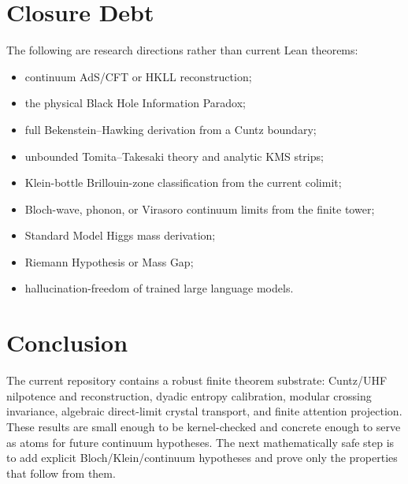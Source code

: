 \documentclass[11pt,a4paper]{article}
\begin{document}
\section{Closure Debt}

The following are research directions rather than current Lean theorems:
\begin{itemize}
  \item continuum AdS/CFT or HKLL reconstruction;
  \item the physical Black Hole Information Paradox;
  \item full Bekenstein--Hawking derivation from a Cuntz boundary;
  \item unbounded Tomita--Takesaki theory and analytic KMS strips;
  \item Klein-bottle Brillouin-zone classification from the current colimit;
  \item Bloch-wave, phonon, or Virasoro continuum limits from the finite tower;
  \item Standard Model Higgs mass derivation;
  \item Riemann Hypothesis or Mass Gap;
  \item hallucination-freedom of trained large language models.
\end{itemize}

\section{Conclusion}

The current repository contains a robust finite theorem substrate: Cuntz/UHF
nilpotence and reconstruction, dyadic entropy calibration, modular crossing
invariance, algebraic direct-limit crystal transport, and finite attention
projection.  These results are small enough to be kernel-checked and concrete
enough to serve as atoms for future continuum hypotheses.  The next mathematically
safe step is to add explicit Bloch/Klein/continuum hypotheses and prove only the
properties that follow from them.
\end{document}

